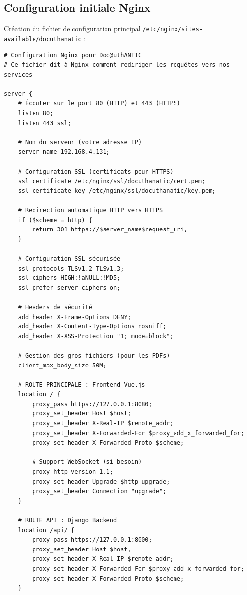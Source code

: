 \documentclass[12pt,a4paper]{article}
\begin{document}
\subsection{Configuration initiale Nginx}

Création du fichier de configuration principal \texttt{/etc/nginx/sites-available/docuthanatic} :

\begin{lstlisting}[style=nginx, caption={Configuration Nginx pour Doc@uthANTIC}, label={lst:nginx_config}]
# Configuration Nginx pour Doc@uthANTIC
# Ce fichier dit à Nginx comment rediriger les requêtes vers nos services

server {
    # Écouter sur le port 80 (HTTP) et 443 (HTTPS)
    listen 80;
    listen 443 ssl;
    
    # Nom du serveur (votre adresse IP)
    server_name 192.168.4.131;
    
    # Configuration SSL (certificats pour HTTPS)
    ssl_certificate /etc/nginx/ssl/docuthanatic/cert.pem;
    ssl_certificate_key /etc/nginx/ssl/docuthanatic/key.pem;
    
    # Redirection automatique HTTP vers HTTPS
    if ($scheme = http) {
        return 301 https://$server_name$request_uri;
    }
    
    # Configuration SSL sécurisée
    ssl_protocols TLSv1.2 TLSv1.3;
    ssl_ciphers HIGH:!aNULL:!MD5;
    ssl_prefer_server_ciphers on;
    
    # Headers de sécurité
    add_header X-Frame-Options DENY;
    add_header X-Content-Type-Options nosniff;
    add_header X-XSS-Protection "1; mode=block";
    
    # Gestion des gros fichiers (pour les PDFs)
    client_max_body_size 50M;
    
    # ROUTE PRINCIPALE : Frontend Vue.js
    location / {
        proxy_pass https://127.0.0.1:8080;
        proxy_set_header Host $host;
        proxy_set_header X-Real-IP $remote_addr;
        proxy_set_header X-Forwarded-For $proxy_add_x_forwarded_for;
        proxy_set_header X-Forwarded-Proto $scheme;
        
        # Support WebSocket (si besoin)
        proxy_http_version 1.1;
        proxy_set_header Upgrade $http_upgrade;
        proxy_set_header Connection "upgrade";
    }
    
    # ROUTE API : Django Backend
    location /api/ {
        proxy_pass https://127.0.0.1:8000;
        proxy_set_header Host $host;
        proxy_set_header X-Real-IP $remote_addr;
        proxy_set_header X-Forwarded-For $proxy_add_x_forwarded_for;
        proxy_set_header X-Forwarded-Proto $scheme;
    }
    

\end{lstlisting}
\end{document}
